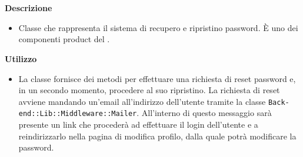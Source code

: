        \textbf{\\ \\ Descrizione} 
          \begin{itemize}
            \item[] Classe che rappresenta il sistema di recupero e ripristino password. È uno dei componenti product del  .
          \end{itemize}      
        \textbf{Utilizzo}  
          \begin{itemize}
            \item[] La classe fornisce dei metodi per effettuare una richiesta di reset password e, in un secondo momento, procedere al suo ripristino. La richiesta di reset avviene mandando un'email all'indirizzo dell'utente tramite la classe \texttt{Back-end::Lib::Middleware::Mailer}. All'interno di questo messaggio sarà presente un link che procederà ad effettuare il login dell'utente e a reindirizzarlo nella pagina di modifica profilo, dalla quale potrà modificare la password.
          \end{itemize}